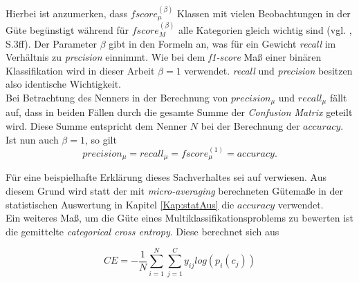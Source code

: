 \documentclass[a4paper,11pt]{article}
\begin{document}
Hierbei ist anzumerken, dass $fscore_{\mu}^{(\beta)}$ Klassen mit vielen Beobachtungen in der Güte begünstigt während für $fscore_M^{(\beta)}$ alle Kategorien gleich wichtig sind  (vgl. \cite{sokolova}, S.3ff). Der Parameter $\beta$ gibt in den Formeln an, was für ein Gewicht \textit{recall} im Verhältnis zu \textit{precision} einnimmt.
Wie bei dem \textit{f1-score} Maß einer binären Klassifikation wird in dieser Arbeit $\beta = 1$ verwendet. \textit{recall} und \textit{precision} besitzen also identische Wichtigkeit. \\
Bei Betrachtung des Nenners in der Berechnung von $precision_{\mu}$ und $recall_{\mu}$ fällt auf, dass in beiden Fällen durch die gesamte Summe der \textit{Confusion Matrix} geteilt wird. Diese Summe entspricht dem Nenner $N$ bei der Berechnung der $accuracy$. Ist nun auch $\beta = 1$, so gilt 
\[precision_{\mu} =  recall_{\mu} =  fscore_{\mu}^{(1)} = accuracy.\]

Für eine beispielhafte Erklärung dieses Sachverhaltes sei auf \cite{towards1} verwiesen. Aus diesem Grund wird statt der mit \textit{micro-averaging} berechneten Gütemaße in der statistischen Auswertung in Kapitel \ref{Kap:statAus} die $accuracy$ verwendet.\\

Ein weiteres Maß, um die Güte eines Multiklassifikationsproblems zu bewerten ist die gemittelte \textit{categorical cross entropy}. Diese berechnet sich aus

\[ CE = - \frac{1}{N}\sum_{i=1}^N \sum_{j = 1}^C y_{ij} log(p_i(c_j)) \]
\end{document}
